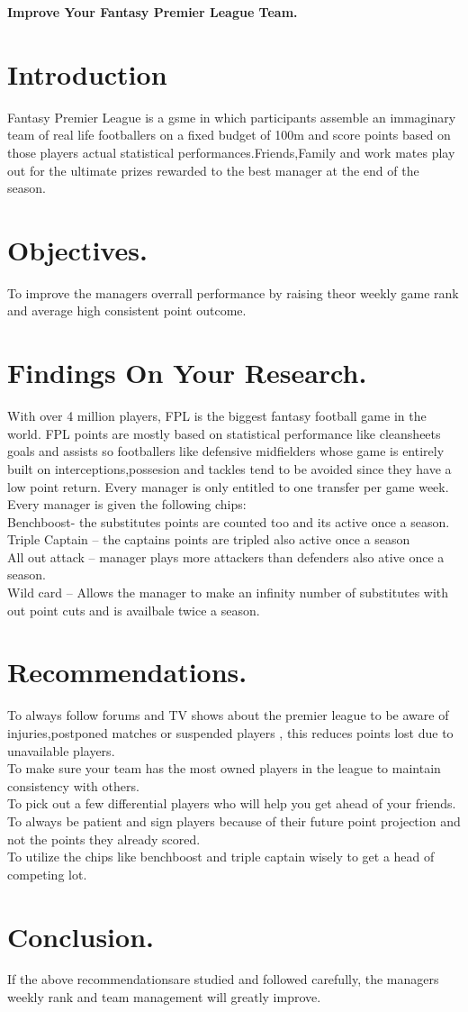 \documentclass[10pt,a4paper]{report}
\begin{document}
\title {}{\textbf{ Improve Your Fantasy Premier League Team.}}
\section{Introduction} 
	Fantasy Premier League is a gsme in which participants assemble an immaginary team of real life footballers on a fixed budget of 100m and score points based on those players actual statistical performances.Friends,Family and work mates play out for the ultimate prizes rewarded to the best manager at the end of the season.
	

\section{Objectives.}
To improve the managers overrall performance by raising theor weekly game rank and average high consistent point outcome.

\section{Findings On Your Research.}
	With over 4 million players, FPL is the biggest fantasy football game in the world.
FPL points are mostly based on statistical performance like cleansheets goals and assists so footballers like defensive midfielders whose game is entirely built on interceptions,possesion and tackles tend to be avoided since they have a low point return.
Every manager is only entitled to one transfer per game week.
Every manager is given the following chips:
\\
Benchboost- the substitutes points are counted too and its active once a season.
\\
Triple Captain – the captains points are tripled also active once a season
\\
All out attack – manager plays more attackers than defenders also ative once a season.
\\
Wild card – Allows the manager to make an infinity number of substitutes with out point cuts and is   availbale twice a season.

\section{Recommendations.}
To always follow forums and TV shows about the premier league to be aware of injuries,postponed matches or suspended players , this reduces points lost due to unavailable players.
\\
To make sure your team has the most owned players in the league to maintain consistency with others.
\\
To pick out a few differential players who will help you get ahead of your friends.
\\
To  always be patient and sign players because of their future point projection and not the points they already scored.
\\
To utilize the chips like benchboost and triple captain wisely to get a head of competing lot.

\section{Conclusion.}
If the above recommendationsare studied and followed carefully, the managers weekly rank and team management will greatly improve.
\end{document}
